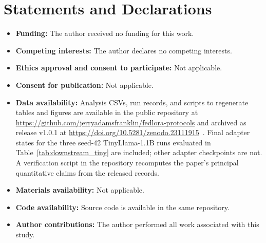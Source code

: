 \documentclass[iicol,pdflatex,sn-mathphys-num]{sn-jnl}
\providecommand{\doiurl}[1]{\url{https://doi.org/#1}}
\begin{document}
\section*{Statements and Declarations}

\begin{itemize}
\item \textbf{Funding:} The author received no funding for this work.
\item \textbf{Competing interests:} The author declares no competing interests.
\item \textbf{Ethics approval and consent to participate:} Not applicable.
\item \textbf{Consent for publication:} Not applicable.
\item \textbf{Data availability:} Analysis CSVs, run records, and scripts to regenerate tables and figures are available in the public repository at \url{https://github.com/jerryadamsfranklin/fedlora-protocols} and archived as release v1.0.1 at \doiurl{10.5281/zenodo.23111915}~\cite{franklin2026fedloraprotocols}. Final adapter states for the three seed-42 TinyLlama-1.1B runs evaluated in Table~\ref{tab:downstream_tiny} are included; other adapter checkpoints are not. A verification script in the repository recomputes the paper's principal quantitative claims from the released records.
\item \textbf{Materials availability:} Not applicable.
\item \textbf{Code availability:} Source code is available in the same repository.
\item \textbf{Author contributions:} The author performed all work associated with this study.
\end{itemize}

\begin{appendices}
\makeatletter
{}%
%
\makeatother

\end{appendices}
\end{document}
